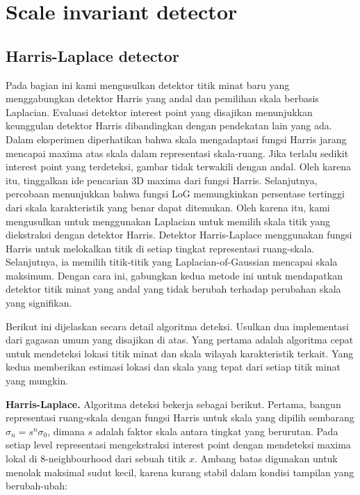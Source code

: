 \section{\textbf{Scale invariant detector}}

\subsection{\textbf{Harris-Laplace detector}}
Pada bagian ini kami mengusulkan detektor titik minat baru yang menggabungkan detektor Harris yang andal dan pemilihan skala berbasis Laplacian. Evaluasi detektor interest point yang disajikan menunjukkan keunggulan detektor Harris dibandingkan dengan pendekatan lain yang ada. Dalam eksperimen diperhatikan bahwa skala mengadaptasi fungsi Harris jarang mencapai maxima atas skala dalam representasi skala-ruang. Jika terlalu sedikit interest point yang terdeteksi, gambar tidak terwakili dengan andal. Oleh karena itu, tinggalkan ide pencarian 3D maxima dari fungsi Harris. Selanjutnya, percobaan menunjukkan bahwa fungsi LoG memungkinkan persentase tertinggi dari skala karakteristik yang benar dapat ditemukan. Oleh karena itu, kami mengusulkan untuk menggunakan Laplacian untuk memilih skala titik yang diekstraksi dengan detektor Harris. Detektor Harris-Laplace menggunakan fungsi Harris untuk melokalkan titik di setiap tingkat representasi ruang-skala. Selanjutnya, ia memilih titik-titik yang Laplacian-of-Gaussian mencapai skala maksimum. Dengan cara ini, gabungkan kedua metode ini untuk mendapatkan detektor titik minat yang andal yang tidak berubah terhadap perubahan skala yang signifikan.

Berikut ini dijelaskan secara detail algoritma deteksi. Usulkan dua implementasi dari gagasan umum yang disajikan di atas. Yang pertama adalah algoritma cepat untuk mendeteksi lokasi titik minat dan skala wilayah karakteristik terkait. Yang kedua memberikan estimasi lokasi dan skala yang tepat dari setiap titik minat yang mungkin.

\textbf{Harris-Laplace.} Algoritma deteksi bekerja sebagai berikut. Pertama, bangun representasi ruang-skala dengan fungsi Harris untuk skala yang dipilih sembarang \(\sigma_{n} = s ^{n}\sigma_{0}\), dimana \(s\) adalah faktor skala antara tingkat yang berurutan. Pada setiap level representasi mengekstraksi interest point dengan mendeteksi maxima lokal di 8-neighbourhood dari sebuah titik \(x\). Ambang batas digunakan untuk menolak maksimal sudut kecil, karena kurang stabil dalam kondisi tampilan yang berubah-ubah:

